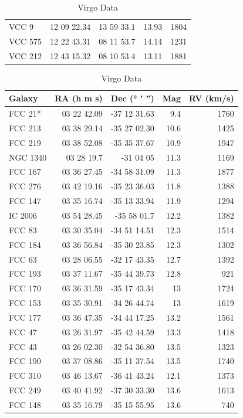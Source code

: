 \documentclass[12pt]{article}
\begin{document}
\begin{table}[!htp]
\begin{minipage}[t]{.45\linewidth}
\begin{tabular}{lrrrr}
VCC 9 & 12 09 22.34 &13 59 33.1 &13.93 &1804 \\
VCC 575 & 12 22 43.31 &08 11 53.7 &14.14 &1231 \\
VCC 212 &12 43 15.32 &08 10 53.4 &13.11 &1881 \\
 \bottomrule
        \end{tabular}
         \caption*{Virgo Data}
    \end{minipage}\hfill
 \begin{minipage}[t]{.45\linewidth}
        \centering
        \scriptsize
        \begin{tabular}{lrrrr}
            \toprule
            Galaxy & RA (h m s) & Dec (° ' '') & Mag & RV (km/s) \\
            \midrule
FCC 21* &03 22 42.09 &-37 12 31.63 &9.4 &1760 \\
FCC 213 &03 38 29.14 &-35 27 02.30 &10.6 &1425 \\
FCC 219 &03 38 52.08 &-35 35 37.67 &10.9 &1947 \\
NGC 1340 &03 28 19.7 &-31 04 05 &11.3 &1169 \\
FCC 167 &03 36 27.45 &-34 58 31.09 &11.3 &1877 \\
FCC 276 &03 42 19.16 &-35 23 36.03 &11.8 &1388 \\
FCC 147 &03 35 16.74 &-35 13 33.94 &11.9 &1294 \\
IC 2006 &03 54 28.45 &-35 58 01.7 &12.2 &1382 \\
FCC 83 &03 30 35.04 &-34 51 14.51 &12.3 &1514 \\
FCC 184 &03 36 56.84 &-35 30 23.85 &12.3 &1302 \\
FCC 63 &03 28 06.55 &-32 17 43.35 &12.7 &1392 \\
FCC 193 &03 37 11.67 &-35 44 39.73 &12.8 &921 \\
FCC 170 &03 36 31.59 &-35 17 43.34 &13 &1724 \\
FCC 153 &03 35 30.91 &-34 26 44.74 &13 &1619 \\
FCC 177 &03 36 47.35 &-34 44 17.25 &13.2 &1561 \\
FCC 47 &03 26 31.97 &-35 42 44.59 &13.3 &1418 \\
FCC 43 &03 26 02.30 &-32 54 36.80 &13.5 &1323 \\
FCC 190 &03 37 08.86 &-35 11 37.54 &13.5 &1740 \\
FCC 310 &03 46 13.67 &-36 41 43.24 & 12.1 &1373 \\
FCC 249 &03 40 41.92 &-37 30 33.30 &13.6 &1613 \\
FCC 148 &03 35 16.79 &-35 15 55.95 &13.6 &740 \\

\end{tabular}
\end{minipage}
\end{table}
\end{document}
